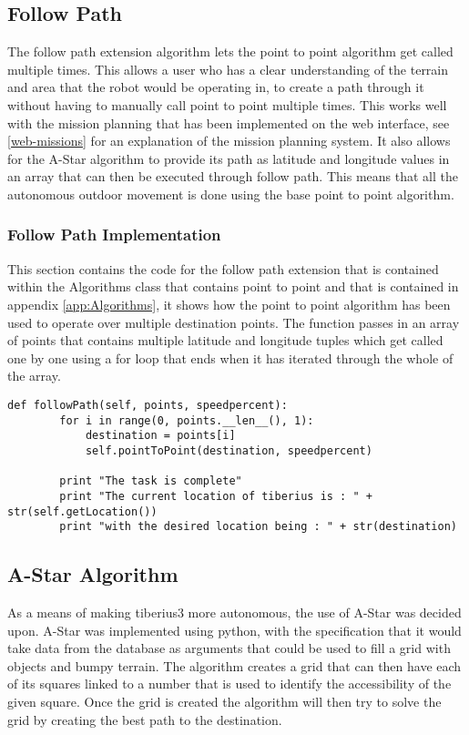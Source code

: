 \subsection{Follow Path}
The follow path extension algorithm lets the point to point algorithm get called multiple times. This allows a user who has a clear understanding of the terrain and area that the robot would be operating in, to create a path through it without having to manually call point to point multiple times. This works well with the mission planning that has been implemented on the web interface, see \ref{web-missions} for an explanation of the mission planning system. It also allows for the A-Star algorithm to provide its path as latitude and longitude values in an array that can then be executed through follow path. This means that all the autonomous outdoor movement is done using the base point to point algorithm.
\subsubsection{Follow Path Implementation}
This section contains the code for the follow path extension that is contained within the Algorithms class that contains point to point and that is contained in appendix \ref{app:Algorithms}, it shows how the point to point algorithm has been used to operate over multiple destination points. The function passes in an array of points that contains multiple latitude and longitude tuples which get called one by one using a for loop that ends when it has iterated through the whole of the array.
\begin{lstlisting}[style=custompython, label=follow-path, caption=follow path function]
    def followPath(self, points, speedpercent):
        for i in range(0, points.__len__(), 1):
            destination = points[i]
            self.pointToPoint(destination, speedpercent)

        print "The task is complete"
        print "The current location of tiberius is : " + str(self.getLocation())
        print "with the desired location being : " + str(destination)
\end{lstlisting}


\subsection{A-Star Algorithm}
As a means of making \gls{tiberius3} more autonomous, the use of A-Star was decided upon. A-Star was implemented using python, with the specification that it would take data from the database as arguments that could be used to fill a grid with objects and bumpy terrain. The algorithm creates a grid that can then have each of its squares linked to a number that is used to identify the accessibility of the given square. Once the grid is created the algorithm will then try to solve the grid by creating the best path to the destination.

